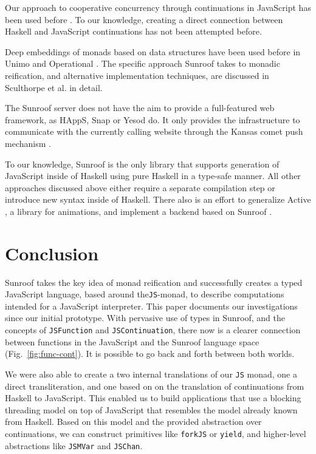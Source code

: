 \documentclass{llncs}
\newcommand{\Src}[1]{{\tt{#1}}}
\newcommand{\JS}{\Src{JS}}
\newcommand{\FigRef}[1]{Fig.~\ref{#1}}
\begin{document}
Our approach to cooperative concurrency through continuations in JavaScript
has been used before 
\cite{Cooper:07:LinksWebProgrammingTiers,Predescu:02:CocoonContinuationBasedControlFlow}.
To our knowledge, creating a direct connection
between Haskell and JavaScript continuations has not been 
attempted before.

Deep embeddings of monads based on data structures have been used before
in Unimo \cite{Lin:06:Unimo} and Operational \cite{Apfelmus:10:Operational,Hackage:10:Operational}.
The specific approach Sunroof takes 
to monadic reification, and alternative implementation techniques,
are discussed in Sculthorpe et al. \cite{Sculthorpe:13:ConstrainedMonads} 
in detail.

The Sunroof server does not have the aim to provide a full-featured 
web framework, as HAppS, Snap or Yesod do. It only provides 
the infrastructure to communicate with the currently calling website
through the Kansas comet \cite{project:kansas-comet} 
push mechanism \cite{pattern:push}. 

To our knowledge, Sunroof is the only library that supports 
generation of JavaScript inside of Haskell using pure Haskell
in a type-safe manner. All other approaches discussed above
either require a separate compilation step or introduce new 
syntax inside of Haskell.
%
There also is an effort to generalize Active \cite{project:active}, a library for animations, and
implement a backend based on Sunroof \cite{project:sunroof-active}.
 
\section{Conclusion}

Sunroof takes the key idea of monad reification and
successfully creates a typed JavaScript language, based around the\JS-monad,
to describe computations intended for a JavaScript interpreter.
This paper documents our investigations since our initial prototype.
With pervasive use of types in Sunroof, and the concepts
of \Src{JSFunction} and \Src{JSContinuation}, there now is a 
clearer connection between
functions in the JavaScript and the Sunroof language space 
(\FigRef{fig:func-cont}). It is possible to go back and forth between 
both worlds. 

We were also able to create a two internal translations of our \JS{} monad,
one a direct transliteration,
and one based on on the translation of continuations from Haskell
to JavaScript. This enabled us to build applications
that use a blocking threading model on top of JavaScript
that resembles the model already known from Haskell.
Based on this model and the provided abstraction over continuations,
we can construct primitives like \Src{forkJS} or \Src{yield},
and higher-level abstractions like \Src{JSMVar} and \Src{JSChan}.
\end{document}
